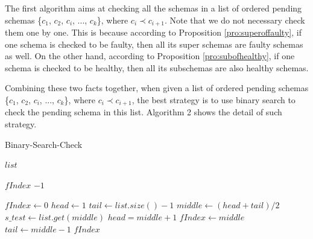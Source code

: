 \documentclass{sig-alternate-05-2015}
\begin{document}
{The first algorithm aims at checking all the schemas in a list of ordered pending schemas \{$c_{1}$, $c_{2}$, $c_{i}$, ..., $c_{k}$\}, where $c_{i} \prec c_{i+1}$.  Note that we do not necessary check them one by one. This is because according to Proposition \ref{pro:superoffaulty}, if one schema is checked to be faulty, then all its super schemas are faulty schemas as well.  On the other hand, according to Proposition \ref{pro:subofhealthy}, if one schema is checked to be healthy, then all its subschemas are also healthy schemas.

Combining these two facts together, when given a list of ordered pending schemas \{$c_{1}$, $c_{2}$, $c_{i}$, ..., $c_{k}$\}, where $c_{i} \prec c_{i+1}$,  the best strategy is to use binary search to check the pending schema in this list. Algorithm 2 shows the detail of such strategy.


\begin{algorithm}[!htb]
  \caption{Binary-Search-Check}
  \begin{algorithmic}[1]
     \Require  $list$ 


    \Ensure  $fIndex$ 
    \State \Return $-1$
    \EndIf

    \State $fIndex \leftarrow 0$
    \State $head  \leftarrow 1$
    \State $tail \leftarrow list.size() - 1 $
        \State $middle \leftarrow (head + tail) / 2$
        \State $s\_test \leftarrow list.get(middle)$
            \State $head = middle + 1$
            \State $fIndex \leftarrow middle$
        \Else
            \State $tail \leftarrow middle - 1  $
        \EndIf
    \EndWhile
\State \Return $fIndex$
  \end{algorithmic}
\end{algorithm}

}
\end{document}
